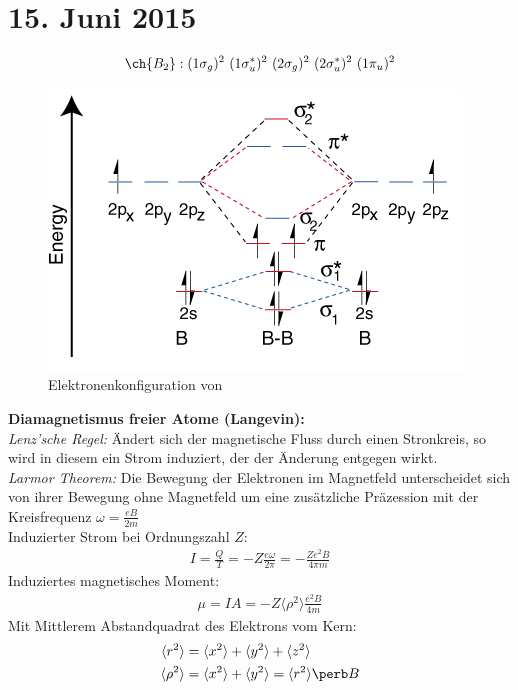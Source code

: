 \section{15. Juni 2015}

\label{q:31}

\[\ch{B_2} : (1\sigma_g)^2 ~ (1\sigma_u^*)^2 ~ (2\sigma_g)^2 ~ (2\sigma_u^*)^2 ~ (1\pi_u)^2\]

\begin{figure}[H]
    \centering
    \begin{samepage}
        \includegraphics[width=0.8\linewidth]{resources/15-06-2015/b2.PNG}
        \caption{Elektronenkonfiguration von }
    \end{samepage}
\end{figure}

\label{q:32}

\textbf{Diamagnetismus freier Atome (Langevin):} \\
\textit{Lenz'sche Regel:} Ändert sich der magnetische Fluss durch einen Stronkreis, so wird in diesem ein Strom induziert, der der Änderung entgegen wirkt. \\
\textit{Larmor Theorem:} Die Bewegung der Elektronen im Magnetfeld unterscheidet sich von ihrer Bewegung ohne Magnetfeld um eine zusätzliche Präzession mit der Kreisfrequenz $\omega = \frac{e B}{2 m}$ \\

Induzierter Strom bei Ordnungszahl $Z$:
\begin{align}
    I = \frac{Q}{T} = - Z \frac{e \omega}{2 \pi} = - \frac{Z e^2 B}{ 4 \pi m}
\end{align}
Induziertes magnetisches Moment:
\begin{align}
    \mu = I A = -Z \langle \rho ^2 \rangle \frac{e^2 B}{4 m}
\end{align}
Mit Mittlerem Abstandquadrat des Elektrons vom Kern:
\begin{align}
    \langle r^2 \rangle &= \langle x^2 \rangle + \langle y^2 \rangle + \langle z^2 \rangle \\
    \langle \rho ^2 \rangle  &= \langle x^2 \rangle + \langle y^2 \rangle = \langle r^2 \rangle \perb B
\end{align}

